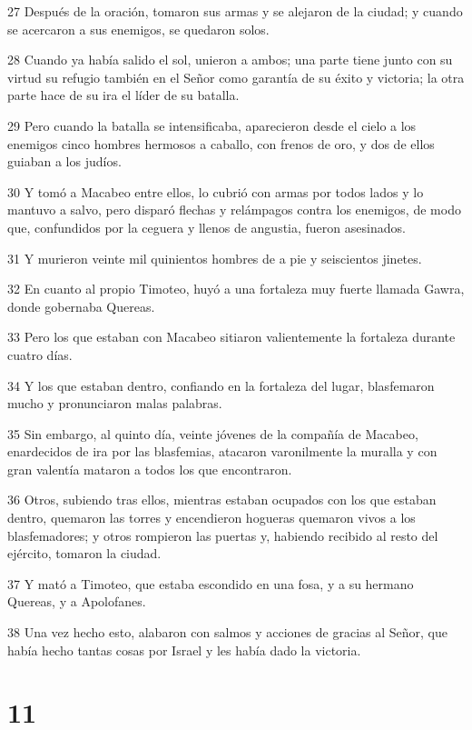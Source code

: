 \par 27 Después de la oración, tomaron sus armas y se alejaron de la ciudad; y cuando se acercaron a sus enemigos, se quedaron solos.
\par 28 Cuando ya había salido el sol, unieron a ambos; una parte tiene junto con su virtud su refugio también en el Señor como garantía de su éxito y victoria; la otra parte hace de su ira el líder de su batalla.
\par 29 Pero cuando la batalla se intensificaba, aparecieron desde el cielo a los enemigos cinco hombres hermosos a caballo, con frenos de oro, y dos de ellos guiaban a los judíos.
\par 30 Y tomó a Macabeo entre ellos, lo cubrió con armas por todos lados y lo mantuvo a salvo, pero disparó flechas y relámpagos contra los enemigos, de modo que, confundidos por la ceguera y llenos de angustia, fueron asesinados.
\par 31 Y murieron veinte mil quinientos hombres de a pie y seiscientos jinetes.
\par 32 En cuanto al propio Timoteo, huyó a una fortaleza muy fuerte llamada Gawra, donde gobernaba Quereas.
\par 33 Pero los que estaban con Macabeo sitiaron valientemente la fortaleza durante cuatro días.
\par 34 Y los que estaban dentro, confiando en la fortaleza del lugar, blasfemaron mucho y pronunciaron malas palabras.
\par 35 Sin embargo, al quinto día, veinte jóvenes de la compañía de Macabeo, enardecidos de ira por las blasfemias, atacaron varonilmente la muralla y con gran valentía mataron a todos los que encontraron.
\par 36 Otros, subiendo tras ellos, mientras estaban ocupados con los que estaban dentro, quemaron las torres y encendieron hogueras quemaron vivos a los blasfemadores; y otros rompieron las puertas y, habiendo recibido al resto del ejército, tomaron la ciudad.
\par 37 Y mató a Timoteo, que estaba escondido en una fosa, y a su hermano Quereas, y a Apolofanes.
\par 38 Una vez hecho esto, alabaron con salmos y acciones de gracias al Señor, que había hecho tantas cosas por Israel y les había dado la victoria.

\chapter{11}

